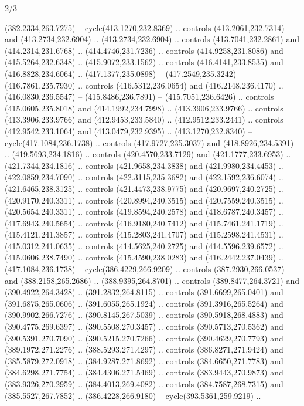 \begin{flagdescription}{2/3}
\begin{scope}[xshift=0.5\flaglength,yshift=0.5\flagwidth,scale=\flagwidth/495.65]
\begin{scope}[y=0.8pt, x=0.8pt, yscale=-1,shift={(-463.76,-309.78)}]
  (382.2334,263.7275) -- cycle(413.1270,232.8369) .. controls
  (413.2061,232.7314) and (413.2734,232.6904) .. (413.2734,232.6904) .. controls
  (413.7041,232.2861) and (414.2314,231.6768) .. (414.4746,231.7236) .. controls
  (414.9258,231.8086) and (415.5264,232.6348) .. (415.9072,233.1562) .. controls
  (416.4141,233.8535) and (416.8828,234.6064) .. (417.1377,235.0898) --
  (417.2549,235.3242) -- (416.7861,235.7930) .. controls (416.5312,236.0654) and
  (416.2148,236.4170) .. (416.0830,236.5547) -- (415.8486,236.7891) --
  (415.7051,236.6426) .. controls (415.0605,235.8018) and (414.1992,234.7998) ..
  (413.3906,233.9766) .. controls (413.3906,233.9766) and (412.9453,233.5840) ..
  (412.9512,233.2441) .. controls (412.9542,233.1064) and (413.0479,232.9395) ..
  (413.1270,232.8340) -- cycle(417.1084,236.1738) .. controls
  (417.9727,235.3037) and (418.8926,234.5391) .. (419.5693,234.1816) .. controls
  (420.4570,233.7129) and (421.1777,233.6953) .. (421.7344,234.1816) .. controls
  (421.9658,234.3838) and (421.9980,234.4453) .. (422.0859,234.7090) .. controls
  (422.3115,235.3682) and (422.1592,236.6074) .. (421.6465,238.3125) .. controls
  (421.4473,238.9775) and (420.9697,240.2725) .. (420.9170,240.3311) .. controls
  (420.8994,240.3515) and (420.7559,240.3515) .. (420.5654,240.3311) .. controls
  (419.8594,240.2578) and (418.6787,240.3457) .. (417.6943,240.5654) .. controls
  (416.9180,240.7412) and (415.7461,241.1719) .. (415.4121,241.3857) .. controls
  (415.2803,241.4707) and (415.2598,241.4531) .. (415.0312,241.0635) .. controls
  (414.5625,240.2725) and (414.5596,239.6572) .. (415.0606,238.7490) .. controls
  (415.4590,238.0283) and (416.2442,237.0439) .. (417.1084,236.1738) --
  cycle(386.4229,266.9209) .. controls (387.2930,266.0537) and
  (388.2158,265.2686) .. (388.9395,264.8701) .. controls (389.8477,264.3721) and
  (390.4922,264.3428) .. (391.2832,264.8115) .. controls (391.6699,265.0401) and
  (391.6875,265.0606) .. (391.6055,265.1924) .. controls (391.3916,265.5264) and
  (390.9902,266.7276) .. (390.8145,267.5039) .. controls (390.5918,268.4883) and
  (390.4775,269.6397) .. (390.5508,270.3457) .. controls (390.5713,270.5362) and
  (390.5391,270.7090) .. (390.5215,270.7266) .. controls (390.4629,270.7793) and
  (389.1972,271.2276) .. (388.5293,271.4297) .. controls (386.8271,271.9424) and
  (385.5879,272.0918) .. (384.9287,271.8692) .. controls (384.6650,271.7783) and
  (384.6298,271.7754) .. (384.4306,271.5469) .. controls (383.9443,270.9873) and
  (383.9326,270.2959) .. (384.4013,269.4082) .. controls (384.7587,268.7315) and
  (385.5527,267.7852) .. (386.4228,266.9180) -- cycle(393.5361,259.9219) ..

\end{scope}
\end{scope}
\end{flagdescription}
